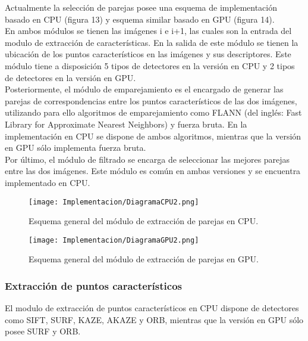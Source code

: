 Actualmente la selección de parejas posee una esquema de  implementación basado en  CPU (figura 13) y  esquema similar basado en GPU (figura 14).\\

En ambos módulos se tienen las imágenes i e i+1, las cuales son la entrada del modulo de extracción de características.
En la salida de este módulo se tienen la ubicación de los puntos característicos en las imágenes y sus descriptores. Este módulo tiene a disposición 5 tipos de detectores en la versión en CPU y 2 tipos de detectores en la versión en GPU.\\

Posteriormente, el módulo de emparejamiento es el encargado de generar las parejas de correspondencias entre los puntos característicos de las dos imágenes, utilizando para ello algoritmos de emparejamiento como FLANN (del inglés: Fast Library for Approximate Nearest Neighbors)
y fuerza bruta. En la implementación en CPU se dispone de ambos algoritmos, mientras que la versión en GPU sólo implementa fuerza bruta.\\

Por último, el módulo de filtrado se encarga de seleccionar las mejores parejas entre las dos imágenes.  Este módulo es común en ambas versiones y se encuentra implementado en CPU.\\

\begin{figure}[H]
	\centering
	\texttt{[image: Implementacion/DiagramaCPU2.png]}
	\caption{Esquema general del módulo de extracción de parejas en CPU.}
	\label{fig:my_label}
\end{figure}


\begin{figure}[H]
	\centering
	\texttt{[image: Implementacion/DiagramaGPU2.png]}
	\caption{Esquema general del módulo de extracción de parejas en GPU.}
	\label{fig:my_label}
\end{figure}

\subsubsection{Extracción de puntos característicos}

El modulo de extracción de puntos característicos en CPU dispone de detectores como SIFT, SURF, KAZE, AKAZE y ORB, mientras que la versión en GPU sólo posee SURF y ORB.\\

